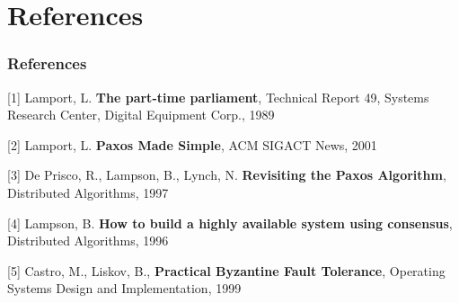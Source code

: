 \documentclass{beamer}
\begin{document}
\section*{References}


\begin{frame}
  \frametitle{References}

[1] Lamport, L. \textbf{The part-time parliament}, Technical Report 49, Systems Research Center, Digital Equipment Corp., 1989
\vspace{4 mm}

[2] Lamport, L. \textbf{Paxos Made Simple}, ACM SIGACT News, 2001
\vspace{4 mm}

[3] De Prisco, R., Lampson, B., Lynch, N. \textbf{Revisiting the Paxos Algorithm}, Distributed Algorithms, 1997
\vspace{4 mm}

[4] Lampson, B. \textbf{How to build a highly available system using consensus}, Distributed Algorithms, 1996
\vspace{4 mm}

[5] Castro, M., Liskov, B., \textbf{Practical Byzantine Fault Tolerance}, Operating Systems Design and Implementation, 1999
  
\end{frame}
\end{document}
